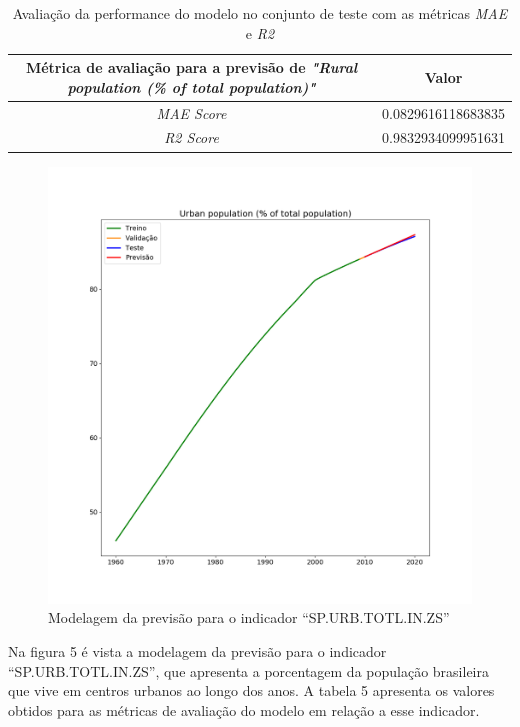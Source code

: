 \begin{table}[H]
    \centering
    \begin{tabular}{|c|c|}
        \hline
        \multicolumn{1}{|p{5cm}|}{Métrica de avaliação para a previsão de \emph{"Rural population (\% of total population)"}} & Valor \\
        \hline
        \emph{MAE Score} & 0.0829616118683835 \\
        \hline
        \emph{R2 Score} & 0.9832934099951631 \\
        \hline 
    \end{tabular}
    \caption{Avaliação da performance do modelo no conjunto de teste com as métricas \emph{MAE} e \emph{R2}}
\end{table}

\begin{figure}[H]
    \centering
    \includegraphics[scale=0.35]{images/Figure_3}
    \caption{Modelagem da previsão para o indicador “SP.URB.TOTL.IN.ZS”}
\end{figure}

Na figura 5 é vista a modelagem da previsão para o indicador ``SP.URB.TOTL.IN.ZS'', que apresenta a porcentagem 
da população brasileira que vive em centros urbanos ao longo dos anos. A tabela 5 apresenta os valores 
obtidos para as métricas de avaliação do modelo em relação a esse indicador. 

